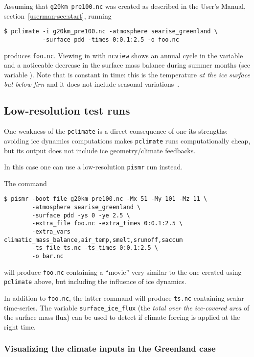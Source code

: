 \documentclass[titlepage,letterpaper,final]{scrartcl}
\begin{document}
Assuming that \texttt{g20km_pre100.nc} was created as described in the User's Manual, section~\ref*{userman-sec:start}, running
\begin{verbatim}
$ pclimate -i g20km_pre100.nc -atmosphere searise_greenland \
           -surface pdd -times 0:0.1:2.5 -o foo.nc
\end{verbatim}%
produces \texttt{foo.nc}. Viewing in with \texttt{ncview} shows an annual cycle in the variable  and a noticeable decrease in the surface mass balance during summer months (see variable ). Note that  is constant in time: this is the temperature \emph{at the ice surface but below firn} and it does not include seasonal variations~\cite{Hock05}.


\subsection{Low-resolution test runs}
\label{sec:low-resolution-test-runs}

One weakness of the \texttt{pclimate} is a direct consequence of one its strengths: avoiding ice dynamics computations makes \texttt{pclimate} runs computationally cheap, but its output does not include ice geometry/climate feedbacks.

In this case one can use a low-resolution \texttt{pismr} run instead.

The command
\begin{verbatim}
$ pismr -boot_file g20km_pre100.nc -Mx 51 -My 101 -Mz 11 \
        -atmosphere searise_greenland \
        -surface pdd -ys 0 -ye 2.5 \
        -extra_file foo.nc -extra_times 0:0.1:2.5 \
        -extra_vars climatic_mass_balance,air_temp,smelt,srunoff,saccum
        -ts_file ts.nc -ts_times 0:0.1:2.5 \
        -o bar.nc
\end{verbatim}%
will produce \texttt{foo.nc} containing a ``movie'' very similar to the one created using \texttt{pclimate} above, but including the influence of ice dynamics.

In addition to \texttt{foo.nc}, the latter command will produce \texttt{ts.nc} containing scalar time-series. The variable \texttt{surface_ice_flux} (the \emph{total over the ice-covered area} of the surface mass flux) can be used to detect if climate forcing is applied at the right time.

\subsubsection{Visualizing the climate inputs in the Greenland case}
\label{sec:pdd-series-with-pclimate}
\end{document}
